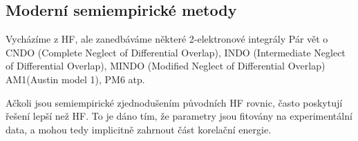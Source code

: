 \subsection{Moderní semiempirické metody}

 Vycházíme z HF, ale zanedbáváme některé 2-elektronové integrály
 Pár vět o CNDO (Complete Neglect of Differential Overlap),
 INDO (Intermediate Neglect of Differential Overlap),
 MINDO (Modified Neglect of Differential Overlap)
 AM1(Austin model 1), PM6 atp.

Ačkoli jsou semiempirické zjednodušením původních HF rovnic, často poskytují řešení lepší než HF.
To je dáno tím, že parametry jsou fitovány na experimentální data, a mohou tedy implicitně zahrnout část korelační energie.


 